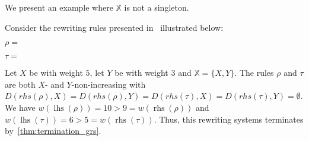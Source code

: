 We present an example where $\mathbb{X}$ is not a singleton.
\begin{example} 
  \label{ex:overbeek_5d6}
  Consider the rewriting rules presented in~\cite[Example 5.6]{overbeek2024termination_lmcs} illustrated below:
  \begin{center}
    $\rho = $\scalebox{0.7} { }
  \end{center}
  \begin{center}
  $\tau = $\scalebox{0.7}{ 
  }
  \end{center}
  Let $X$ be 
   with weight $5$, let $Y$ be
   with weight $3$ and $\mathbb{X} = \{X, Y\}$.
  The rules $\rho$ and $\tau$ are both $X$- and $Y$-non-increasing with $D(rhs(\rho), X) = D(rhs(\rho), Y) = D(rhs(\tau), X) = D(rhs(\tau), Y) = \emptyset$.   
  We have $
  w(\operatorname{lhs}(\rho)) = 10 > 9 = w(\operatorname{rhs}(\rho))
  $ and $
  w(\operatorname{lhs}(\tau)) = 6 > 5 = w(\operatorname{rhs}(\tau))$.
  Thus, this rewriting systems terminates by~\autoref{thm:termination_grs}.
\end{example}